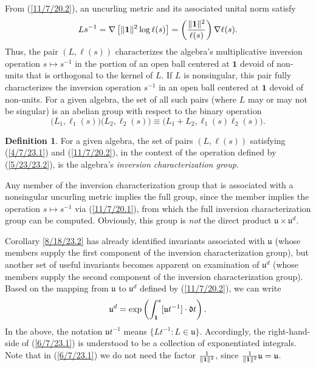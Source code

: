 \documentclass{amsart}
\numberwithin{equation}{section}
\theoremstyle{definition}
\newtheorem{definition}[theorem]{Definition}
\numberwithin{theorem}{section}
\begin{document}
  
    From (\ref{11/7/20.2}), an uncurling metric and its associated unital norm satisfy  \begin{equation}\label{11/7/20.1} Ls^{-1}  = \nabla\left[\|{\bf 1}\|^2\log  \ell(s)\right] =   \left(\frac{\|{\bf 1}\|^2}{ \ell(s)}\right)\nabla \ell(s).\end{equation} 
Thus, the pair $(L, \ell(s))$ characterizes the algebra's multiplicative inversion operation $s\mapsto s^{-1}$ in the portion of an open ball centered at $\mathbf{1}$ devoid of non-units that is orthogonal to the kernel of $L$.  If $L$ is nonsingular, this pair fully characterizes the inversion operation $s^{-1}$ in an open ball centered at $\mathbf{1}$ devoid of non-units.  For a given algebra, the set of all such pairs (where $L$ may or may not be singular) is an abelian group with respect to the binary operation 
\begin{equation}\label{5/23/23.2} \big(L_1, \ell_1(s)\big)\big(L_2, \ell_2(s)\big) \equiv 
\big(L_1+L_2, \ell_1(s)  \ell_2(s)\big).\end{equation} 
\begin{definition} For a given algebra, the set of pairs $(L, \ell(s))$ satisfying (\ref{4/7/23.1}) and (\ref{11/7/20.2}), in the context of the operation defined by (\ref{5/23/23.2}), is the algebra's {\it inversion characterization group}. \end{definition}

Any member of the inversion characterization group that is associated with a nonsingular uncurling metric implies the full group, since the member implies the operation $s\mapsto s^{-1}$ via (\ref{11/7/20.1}), from which the full inversion characterization group can be computed.  Obviously, this group is {\it not} the direct product $\mathfrak{u}\times\mathfrak{u}^d$. 

Corollary \ref{8/18/23.2} has already identified invariants associated with $\mathfrak{u}$ (whose members supply the first component of the inversion characterization group), but another set of useful invariants becomes apparent on examination of $\mathfrak{u}^d$ (whose members supply the second component of the inversion characterization group).  Based on the mapping from $\mathfrak{u}$ to $\mathfrak{u}^d$ defined by (\ref{11/7/20.2}),  we can write \begin{equation}  \mathfrak{u}^d = \exp\left(\int_{\bf 1}^s [\mathfrak{u}t^{-1}]\cdot \mathfrak{d}t\right). \label{6/7/23.1}\end{equation}  In the above, the notation $\mathfrak{u}t^{-1}$ means $\{Lt^{-1}: L\in \mathfrak{u}\}$.  Accordingly, the right-hand-side of (\ref{6/7/23.1}) is understood to be a collection of exponentiated integrals.   Note that in (\ref{6/7/23.1}) we do not need the factor $\frac{1}{\|{\bf 1}\|^2}$, since $\frac{1}{\|{\bf 1}\|^2}\mathfrak{u}=\mathfrak{u}$.  
\end{document}
